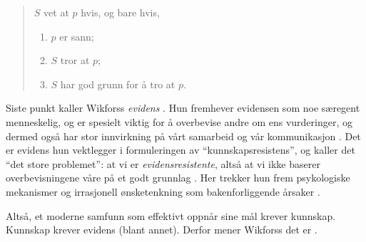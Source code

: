 \documentclass[a4paper,norsk]{article}
\begin{document}
\blockquote{
  $S$ vet at $p$ hvis, og bare hvis,
  \begin{enumerate}
    \def\labelenumi{\roman{enumi}.}
    \item $p$ er sann;
    \item $S$ tror at $p$;
    \item $S$ har god grunn for å tro at $p$.
  \end{enumerate}
}

Siste punkt kaller Wikforss \emph{evidens} \autocite[87]{wikforss}. Hun
fremhever evidensen som noe særegent menneskelig, og er spesielt viktig for å
overbevise andre om ens vurderinger, og dermed også har stor innvirkning på
vårt samarbeid og vår kommunikasjon \autocite[99]{wikforss}. Det er evidens hun
vektlegger i formuleringen av \enquote{kunnskapsresistens}, og kaller det
\enquote{det store problemet}: at vi er \emph{evidensresistente}, altså at vi
ikke baserer overbevisningene våre på et godt grunnlag \autocite[99]{wikforss}.
Her trekker hun frem psykologiske mekanismer og irrasjonell ønsketenkning som
bakenforliggende årsaker \autocite[99]{wikforss}.

Altså, et moderne samfunn som effektivt oppnår sine mål krever kunnskap.
Kunnskap krever evidens (blant annet). Derfor mener Wikforss det er
.

\printbibliography
\end{document}

